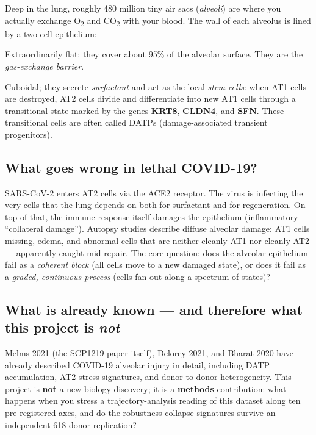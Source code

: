 \documentclass[11pt]{article}
\begin{document}
Deep in the lung, roughly 480 million tiny air sacs (\emph{alveoli}) are where you
actually exchange O\textsubscript{2} and CO\textsubscript{2} with your blood. The wall
of each alveolus is lined by a two-cell epithelium:

\begin{description}[style=nextline]
\item[AT1 (alveolar type I) cells] Extraordinarily flat; they cover about 95\% of the
      alveolar surface. They are the \emph{gas-exchange barrier}.
\item[AT2 (alveolar type II) cells] Cuboidal; they secrete \emph{surfactant} and act as
      the local \emph{stem cells}: when AT1 cells are destroyed, AT2 cells divide and
      differentiate into new AT1 cells through a transitional state marked by the genes
      \textbf{KRT8}, \textbf{CLDN4}, and \textbf{SFN}. These transitional cells are
      often called DATPs (damage-associated transient progenitors).
\end{description}

\subsection{What goes wrong in lethal COVID-19?}

SARS-CoV-2 enters AT2 cells via the ACE2 receptor. The virus is infecting the very
cells that the lung depends on both for surfactant and for regeneration. On top of that,
the immune response itself damages the epithelium (inflammatory ``collateral damage'').
Autopsy studies describe diffuse alveolar damage: AT1 cells missing, edema, and
abnormal cells that are neither cleanly AT1 nor cleanly AT2 --- apparently caught
mid-repair. The core question: does the alveolar epithelium fail as a \emph{coherent
block} (all cells move to a new damaged state), or does it fail as a \emph{graded,
continuous process} (cells fan out along a spectrum of states)?

\subsection{What is already known --- and therefore what this project is \emph{not}}

Melms 2021 (the SCP1219 paper itself), Delorey 2021, and Bharat 2020 have already
described COVID-19 alveolar injury in detail, including DATP accumulation, AT2 stress
signatures, and donor-to-donor heterogeneity. This project is \textbf{not} a new
biology discovery; it is a \textbf{methods} contribution: what happens when you stress
a trajectory-analysis reading of this dataset along ten pre-registered axes, and do the
robustness-collapse signatures survive an independent 618-donor replication?
\end{document}
